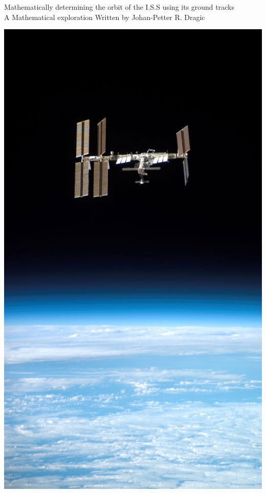\documentclass[12pt]{article}
\begin{document}
    \begin{titlepage}
        \begin{center}
            {\LARGE Mathematically determining the orbit of the I.S.S using its ground tracks}
            \break
            \\
            {\large A Mathematical exploration}
            \break
            \small{Written by Johan-Petter R. Dragic}
            {\date{06.11.2018}}
            

            \vspace{20mm}
            \includegraphics[scale=1.5]{iss2.jpg}
            

        \end{center}
    \end{titlepage}
\end{document}
